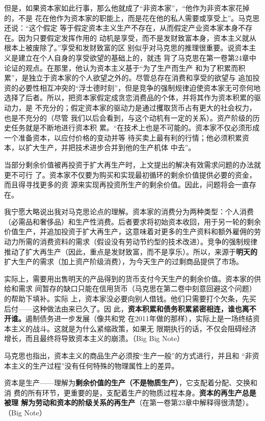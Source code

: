 但是，如果资本家如此行事，那么他就成了“非资本家”，“他作为非资本家花掉的，不是
花在他作为资本家的职能上，而是花在他的私人需要或享受上”。马克思还说：“这个假定
等于假定资本主义生产不存在，从而假定产业资本家本身不存在。因为只要假定发挥作用的
动机是享受，而不是发财致富本身，资本主义就从根本上被废除了。”享受和发财致富的区
别似乎对马克思的推理很重要。说资本主义是建立在个人自身的享受欲望的基础上的，就违
背了马克思在第一卷第24章中论证的观点。在那里，他认为资本主义基于“为了生产而生产
和为了积累而积累”，是独立于资本家的个人欲望之外的。尽管总存在消费和享受的欲望与
追加投资的必要性相互冲突的“浮士德时刻”，但是竞争的强制规律迫使资本家无可奈何地
选择了后者。所以，把资本家假定成贪恋消费品的个体，并将其作为资本积累的驱动力，是
不充分的；假定资本家的驱动力是通过攫取货币占有更大的社会权力，也是不充分的（尽管
我们以后会看到，与这个动机有一定的关系）。资产阶级的历史任务就是不断地进行资本积
累。“在技术上也是不可能的。资本家不仅必须形成一个准备资本，以应付价格的变动并等
待买卖上最有利的行情；他必须积累资本，以扩大生产，并把技术进步合并到他的生产机体
中去”。

当部分剩余价值被再投资于扩大再生产时，上文提出的解决有效需求问题的办法就更不可行
了。资本家不仅要为购买和实现最初循环的剩余价值提供必要的资金，而且得寻找更多的资
源来实现再投资所生产的剩余价值。因此，问题将会一直存在。

我宁愿大略说出我对马克思论点的理解。资本家的消费分为两种类型：个人消费（必需品和奢侈品）和生产性消费。后者要求将初始资本收回，用于另一轮的剩余价值生产，并追加投资于扩大再生产，这意味着对更多的生产资料和额外雇佣的劳动力所需的消费资料的需求（假设没有劳动节约型的技术改进）。竞争的强制规律推动了扩大再生产（因此，重点是发财致富，而不是享乐）。所以，来源于\textbf{明天的}扩大生产的需求（加上资产阶级消费），为今天生产的过剩商品提供了市场。

实际上，需要用出售明天的产品得到的货币支付今天生产的剩余价值。资本家的供给和需求
间暂存的缺口只能在信用货币（马克思在第二卷中刻意回避这个问题）的帮助下填补。实际
上，资本家没必要向别人借钱。他们只需要打个欠条，先买后付——这种做法由来已久了。因
此，\textbf{资本积累和债务积累紧密相连，谁也离不开谁。}遏制债务进一步发展（像共和党
在2011年做的那样），实际上是一场终结资本主义的战斗。这就是为什么紧缩政策，如果无
限期执行的话，不仅会阻碍经济增长，而且最终将导致资本主义的崩溃。（Big Big Note）

马克思也指出，资本主义的商品生产必须按“生产一般”的方式进行，并且和 “非资本主义的生产过程”没有任何特殊的物理属性上的差异。

资本是生产——理解为\textbf{剩余价值的生产（不是物质生产）}，它支配着分配、交换和消
费的所有环节，更重要的是，支配着生产的物质过程本身。\textbf{资本的再生产总是被理
  解为劳动和资本的阶级关系的再生产}（在第一卷第23章中解释得很清楚）。（Big Note）

